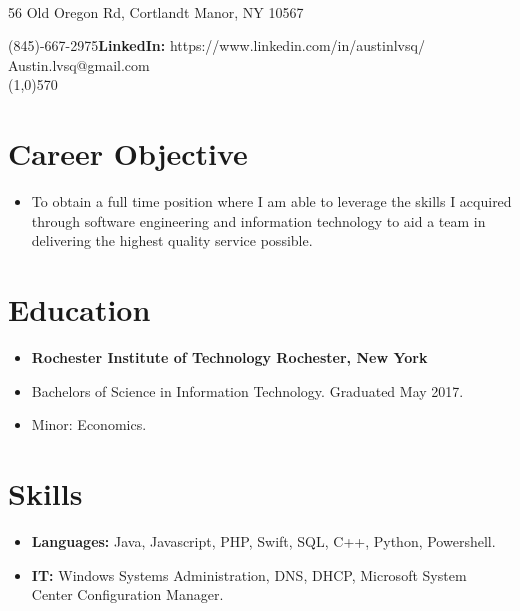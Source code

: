 \documentclass[10pt]{Article}
\begin{document}
\begin{center}
\\
\vspace{.5ex}
56 Old Oregon Rd, Cortlandt Manor, NY 10567
\end{center}
 (845)-667-2975\hfill{\bf LinkedIn:}
 https://www.linkedin.com/in/austinlvsq/\\
 Austin.lvsq@gmail.com\\
\line(1,0){570}

\section*{Career Objective}
\begin{itemize}[topsep=1ex, itemsep=.5ex, parsep=0ex, partopsep=.7ex]
	\item[]To obtain a full time position where I am able to leverage the skills I
	 acquired through software engineering and information technology to aid a
	 team in delivering the highest quality service possible.
\end{itemize}

\section*{Education}
\begin{itemize}[topsep=1ex, itemsep=.5ex, parsep=0ex, partopsep=.7ex]
	\item[]{{\bf Rochester Institute of Technology \hfill Rochester, New York}}
  \item[] Bachelors of Science in Information Technology. \hfill Graduated May 2017.
  \item[] Minor: Economics.
\end{itemize}

\section*{Skills}
\begin{itemize}[topsep=1ex, itemsep=.5ex, parsep=0ex, partopsep=.7ex]
	\item[]{\bf Languages:} Java, Javascript, PHP, Swift, SQL, C++, Python, Powershell.
	\item[]{\bf IT:} Windows Systems Administration, DNS, DHCP, Microsoft System
	Center Configuration Manager.
\end{itemize}
\end{document}
